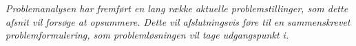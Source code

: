 \textit{Problemanalysen har fremført en lang række aktuelle problemstillinger, som dette afsnit vil forsøge at opsummere. Dette vil afslutningsvis føre til en sammenskrevet problemformulering, som problemløsningen vil tage udgangspunkt i.}